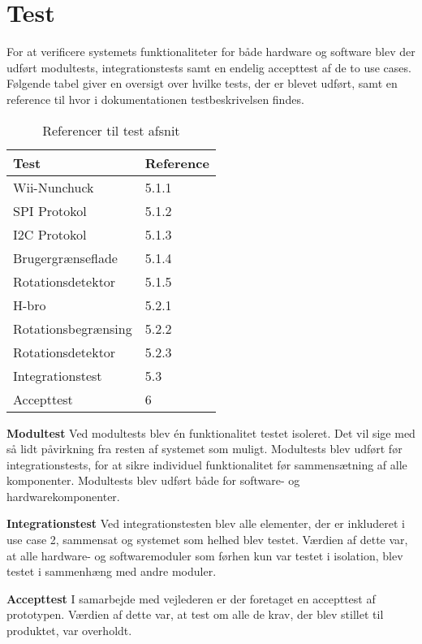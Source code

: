 \chapter{Test}
For at verificere systemets funktionaliteter for både hardware og software blev der udført modultests, integrationstests samt en endelig accepttest af de to use cases. Følgende tabel giver en oversigt over hvilke tests, der er blevet udført, samt en reference til hvor i dokumentationen testbeskrivelsen findes.

\begin{table}[H]
	\centering
	\label{test}
	\begin{tabular}{|l|l|}
		\hline
		\textbf{Test}      & \textbf{Reference} \\ \hline
		Wii-Nunchuck        & 5.1.1              \\ \hline
		SPI Protokol        & 5.1.2              \\ \hline
		I2C Protokol        & 5.1.3              \\ \hline
		Brugergrænseflade   & 5.1.4              \\ \hline
		Rotationsdetektor   & 5.1.5              \\ \hline
		H-bro               & 5.2.1              \\ \hline
		Rotationsbegrænsing & 5.2.2              \\ \hline
		Rotationsdetektor   & 5.2.3              \\ \hline
		Integrationstest    & 5.3                \\ \hline
		Accepttest          & 6                  \\ \hline
		
	\end{tabular}
	\caption{Referencer til test afsnit}
\end{table}

\noindent \textbf{Modultest} \newline
\noindent Ved modultests blev én funktionalitet testet isoleret. Det vil sige med så lidt påvirkning fra resten af systemet som muligt. Modultests blev udført før integrationstests, for at sikre individuel funktionalitet før sammensætning af alle komponenter. Modultests blev udført både for software- og hardwarekomponenter. \newline

\noindent \textbf{Integrationstest} \newline
\noindent Ved integrationstesten blev alle elementer, der er inkluderet i use case 2, sammensat og systemet som helhed blev testet. Værdien af dette var, at alle hardware- og softwaremoduler som førhen kun var testet i isolation, blev testet i sammenhæng med andre moduler.  \newline

\noindent \textbf{Accepttest} \newline
\noindent I samarbejde med vejlederen er der foretaget en accepttest af prototypen. Værdien af dette var, at test om alle de krav, der blev stillet til produktet, var overholdt.
